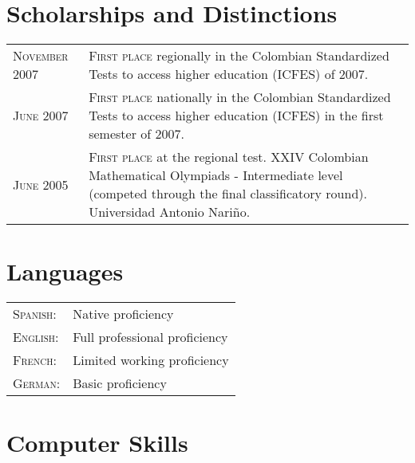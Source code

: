 \documentclass[a4paper,10pt]{article} %
\begin{document}

\color{OrangeRed}
\section{Scholarships and Distinctions}
\color{black}

\begin{tabular}{p{2.7cm}p{11.1cm}}
\textsc{November 2007} & \textsc{First place} regionally in the Colombian Standardized Tests to access higher education (ICFES) of 2007. \\
\textsc{June 2007} & \textsc{First place} nationally in the Colombian Standardized Tests to access higher education (ICFES) in the first semester of 2007. \\
\textsc{June 2005} & \textsc{First place} at the regional test. XXIV Colombian Mathematical Olympiads - Intermediate level (competed through the final classificatory round). Universidad Antonio Nariño.
\end{tabular}


\color{OrangeRed}
\section{Languages}
\color{black}

\begin{tabular}{ll}
\textsc{Spanish:} & Native proficiency\\
\textsc{English:} & Full professional proficiency \\
\textsc{French:} & Limited working proficiency \\
\textsc{German:} & Basic proficiency 
\end{tabular}


\color{OrangeRed}
\section{Computer Skills}
\color{black}
 
\end{document}
